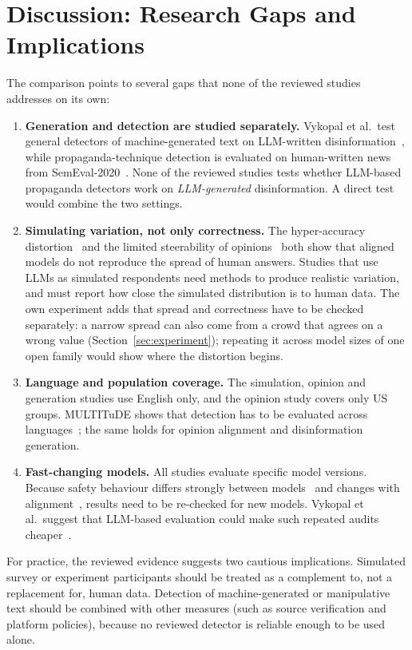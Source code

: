 \section{Discussion: Research Gaps and Implications}
\label{sec:governance}

The comparison points to several gaps that none of the reviewed studies addresses on its own:
\begin{enumerate}
    \item \textbf{Generation and detection are studied separately.} Vykopal et al.\ test general detectors of machine-generated text on LLM-written disinformation~\cite{vykopal2024disinformation}, while propaganda-technique detection is evaluated on human-written news from SemEval-2020~\cite{dasanmartino2020semeval, gaeta2025towards}. None of the reviewed studies tests whether LLM-based propaganda detectors work on \emph{LLM-generated} disinformation. A direct test would combine the two settings.
    \item \textbf{Simulating variation, not only correctness.} The hyper-accuracy distortion~\cite{aher2023using} and the limited steerability of opinions~\cite{santurkar2023whose} both show that aligned models do not reproduce the spread of human answers. Studies that use LLMs as simulated respondents need methods to produce realistic variation, and must report how close the simulated distribution is to human data. The own experiment adds that spread and correctness have to be checked separately: a narrow spread can also come from a crowd that agrees on a wrong value (Section~\ref{sec:experiment}); repeating it across model sizes of one open family would show where the distortion begins.
    \item \textbf{Language and population coverage.} The simulation, opinion and generation studies use English only, and the opinion study covers only US groups. MULTITuDE shows that detection has to be evaluated across languages~\cite{macko2023multitude}; the same holds for opinion alignment and disinformation generation.
    \item \textbf{Fast-changing models.} All studies evaluate specific model versions. Because safety behaviour differs strongly between models~\cite{vykopal2024disinformation} and changes with alignment~\cite{aher2023using, santurkar2023whose}, results need to be re-checked for new models. Vykopal et al.\ suggest that LLM-based evaluation could make such repeated audits cheaper~\cite{vykopal2024disinformation}. %
\end{enumerate}
For practice, the reviewed evidence suggests two cautious implications. Simulated survey or experiment participants should be treated as a complement to, not a replacement for, human data. Detection of machine-generated or manipulative text should be combined with other measures (such as source verification and platform policies), because no reviewed detector is reliable enough to be used alone.
